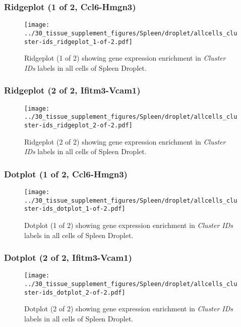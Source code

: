 \clearpage

\subsubsection{Ridgeplot (1 of 2, Ccl6-Hmgn3)}
\begin{figure}[h]
\centering
\texttt{[image: ../30\_tissue\_supplement\_figures/Spleen/droplet/allcells\_cluster-ids\_ridgeplot\_1-of-2.pdf]}

\caption{ Ridgeplot (1 of 2)  showing gene expression enrichment in \emph{Cluster IDs} labels in all cells of Spleen Droplet. }
\end{figure}


\clearpage

\subsubsection{Ridgeplot (2 of 2, Ifitm3-Vcam1)}
\begin{figure}[h]
\centering
\texttt{[image: ../30\_tissue\_supplement\_figures/Spleen/droplet/allcells\_cluster-ids\_ridgeplot\_2-of-2.pdf]}

\caption{ Ridgeplot (2 of 2)  showing gene expression enrichment in \emph{Cluster IDs} labels in all cells of Spleen Droplet. }
\end{figure}


\clearpage

\subsubsection{Dotplot (1 of 2, Ccl6-Hmgn3)}
\begin{figure}[h]
\centering
\texttt{[image: ../30\_tissue\_supplement\_figures/Spleen/droplet/allcells\_cluster-ids\_dotplot\_1-of-2.pdf]}

\caption{ Dotplot (1 of 2)  showing gene expression enrichment in \emph{Cluster IDs} labels in all cells of Spleen Droplet. }
\end{figure}


\clearpage

\subsubsection{Dotplot (2 of 2, Ifitm3-Vcam1)}
\begin{figure}[h]
\centering
\texttt{[image: ../30\_tissue\_supplement\_figures/Spleen/droplet/allcells\_cluster-ids\_dotplot\_2-of-2.pdf]}

\caption{ Dotplot (2 of 2)  showing gene expression enrichment in \emph{Cluster IDs} labels in all cells of Spleen Droplet. }
\end{figure}


